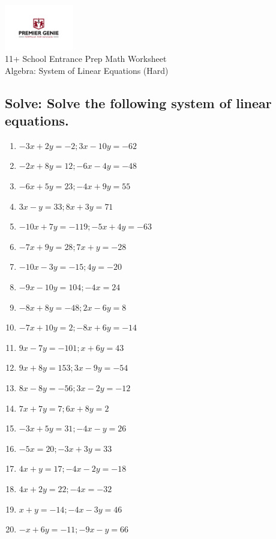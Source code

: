 \documentclass{article}
\begin{document}
\begin{center}
\includegraphics[width=3cm]{PREMGENIEJPG.jpg}\\
{\Large 11+ School Entrance Prep Math Worksheet}\\
{\Medium Algebra: System of Linear Equations (Hard)}\\

\end{center}

\subsection*{Solve: Solve the following system of linear equations.}

\begin{enumerate}
\item $\displaystyle {- 3 x + 2 y}=-2 ; {3 x - 10 y}=-62 $ \ 
\item $\displaystyle {- 2 x + 8 y}=12 ; {- 6 x - 4 y}=-48 $ \ 
\item $\displaystyle {- 6 x + 5 y}=23 ; {- 4 x + 9 y}=55 $ \ 
\item $\displaystyle {3 x - y}=33 ; {8 x + 3 y}=71 $ \ 
\item $\displaystyle {- 10 x + 7 y}=-119 ; {- 5 x + 4 y}=-63 $ \ 
\item $\displaystyle {- 7 x + 9 y}=28 ; {7 x + y}=-28 $ \ 
\item $\displaystyle {- 10 x - 3 y}=-15 ; {4 y}=-20 $ \ 
\item $\displaystyle {- 9 x - 10 y}=104 ; {- 4 x}=24 $ \ 
\item $\displaystyle {- 8 x + 8 y}=-48 ; {2 x - 6 y}=8 $ \ 
\item $\displaystyle {- 7 x + 10 y}=2 ; {- 8 x + 6 y}=-14 $ \ 
\item $\displaystyle {9 x - 7 y}=-101 ; {x + 6 y}=43 $ \ 
\item $\displaystyle {9 x + 8 y}=153 ; {3 x - 9 y}=-54 $ \ 
\item $\displaystyle {8 x - 8 y}=-56 ; {3 x - 2 y}=-12 $ \ 
\item $\displaystyle {7 x + 7 y}=7 ; {6 x + 8 y}=2 $ \ 
\item $\displaystyle {- 3 x + 5 y}=31 ; {- 4 x - y}=26 $ \ 
\item $\displaystyle {- 5 x}=20 ; {- 3 x + 3 y}=33 $ \ 
\item $\displaystyle {4 x + y}=17 ; {- 4 x - 2 y}=-18 $ \ 
\item $\displaystyle {4 x + 2 y}=22 ; {- 4 x}=-32 $ \ 
\item $\displaystyle {x + y}=-14 ; {- 4 x - 3 y}=46 $ \ 
\item $\displaystyle {- x + 6 y}=-11 ; {- 9 x - y}=66 $ \ 


\end{enumerate}
\end{document}
